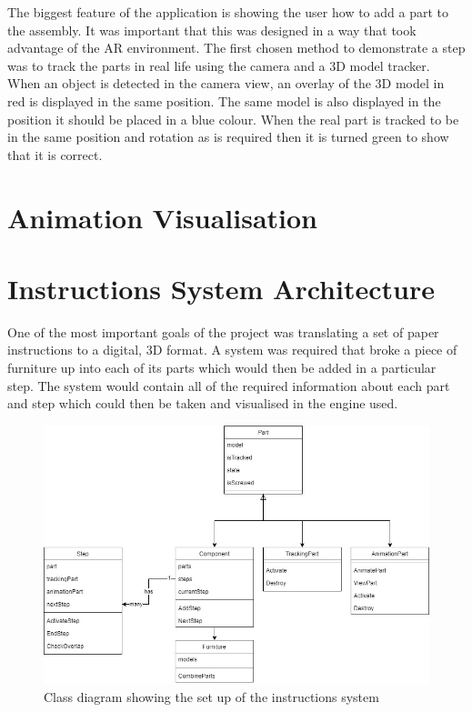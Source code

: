 \documentclass{l4proj}
\begin{document}
The biggest feature of the application is showing the user how to add a part to the assembly. It was important that this was designed in a way that took advantage of the AR environment. The first chosen method to demonstrate a step was to track the parts in real life using the camera and a 3D model tracker. When an object is detected in the camera view, an overlay of the 3D model in red is displayed in the same position. The same model is also displayed in the position it should be placed in a blue colour. When the real part is tracked to be in the same position and rotation as is required then it is turned green to show that it is correct.

\section{Animation Visualisation}

\section{Instructions System Architecture}

One of the most important goals of the project was translating a set of paper instructions to a digital, 3D format. A system was required that broke a piece of furniture up into each of its parts which would then be added in a particular step. The system would contain all of the required information about each part and step which could then be taken and visualised in the engine used.

\begin{figure}[hbt!]
    \centering
    \includegraphics[width=0.8\linewidth]{dissertation//images/classDiagram.jpg}
    \caption{Class diagram showing the set up of the instructions system}
    \label{fig:classDiagram}
\end{figure}
\end{document}
